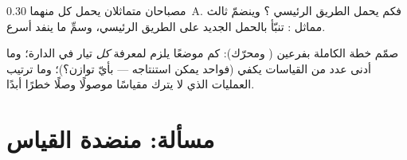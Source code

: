 \begin{exercise}[$\star\star$]\label{exo:g8:intensity-ammeter:11}
مصباحان متماثلان  يحمل كل منهما \qty{0.30}{A}. فكم
يحمل الطريق الرئيسي ؟ وينضمّ  ثالث مماثل : تنبّأ بالحمل الجديد على الطريق الرئيسي، وسمِّ ما ينفد
أسرع.
\end{exercise}

\begin{exercise}[$\star\star\star$]\label{exo:g8:intensity-ammeter:12}
صمّم خطة  الكاملة  بفرعين (
ومحرّك): كم موضعًا  يلزم لمعرفة \emph{كل} تيار في
الدارة؛ وما أدنى عدد من القياسات يكفي (فواحد يمكن استنتاجه ---
بأيّ توازن؟)؛ وما ترتيب العمليات الذي لا يترك مقياسًا موصولًا
وصلًا خطرًا أبدًا.
\end{exercise}

\section{مسألة: منضدة القياس}

